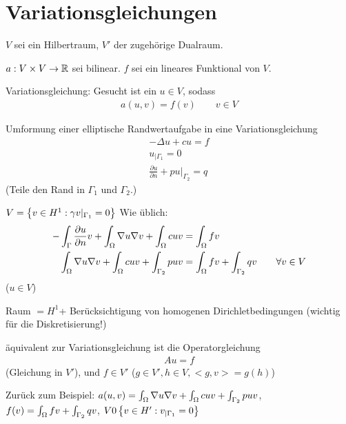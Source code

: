 \section{Variationsgleichungen}
$V$ sei ein Hilbertraum, $V'$ der zugehörige Dualraum.

$a: V \times V \to \mathbb{R}$ sei bilinear. $f$ sei ein lineares Funktional von $V$.

Variationsgleichung: Gesucht ist ein $u \in V$, sodass
\begin{align*}
  a(u,v) = f(v) \qquad v \in V
\end{align*}

\begin{beispiel}
  Umformung einer elliptische Randwertaufgabe in eine Variationsgleichung
  \begin{align*}
    - \Delta u + c u = f\\
u_{|\Gamma_1} = 0\\
\frac{\partial u}{\partial n} + p u |_{\Gamma_2} = q
  \end{align*}
(Teile den Rand in $\Gamma_1$ und $\Gamma_2$.)

$V = \left\{ v \in H^1: \gamma v |_{\Gamma_1} = 0 \right\}$ Wie üblich:
\begin{align*}
  - \int_\Gamma \frac{\partial u}{\partial n} v + \int_{\Omega} \nabla u \nabla v + \int_\Omega c u v &= \int_\Omega f v\\
  \int_{\Omega} \nabla u \nabla v + \int_\Omega c u v + \int_{\Gamma_2}p u v &= \int_\Omega f v + \int_{\Gamma_2} q v \qquad \forall v \in V 
\end{align*}
($u \in V$)

Raum  $= H^1$+ Berücksichtigung von homogenen Dirichletbedingungen (wichtig für die Diskretisierung!)
\end{beispiel}


äquivalent zur Variationsgleichung ist die Operatorgleichung
\begin{align*}
  A u = f
\end{align*}
(Gleichung in $V'$), und $f \in V'$ ($g \in V', h \in V, <g, v> = g(h)$)

Zurück zum Beispiel: $a(u, v) = \int_\Omega \nabla u \nabla v + \int_\Omega c u v + \int_{\Gamma_2} p u v$, $f(v)= \int_\Omega f v + \int_{\Gamma_2} q v$, $V 0 \left\{ v \in H' : v_{|\Gamma_1}= 0 \right\}$ 

